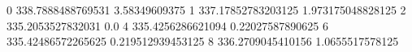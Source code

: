 0 338.7888488769531 3.58349609375
1 337.17852783203125 1.973175048828125
2 335.2053527832031 0.0
4 335.4256286621094 0.22027587890625
6 335.42486572265625 0.219512939453125
8 336.2709045410156 1.0655517578125
